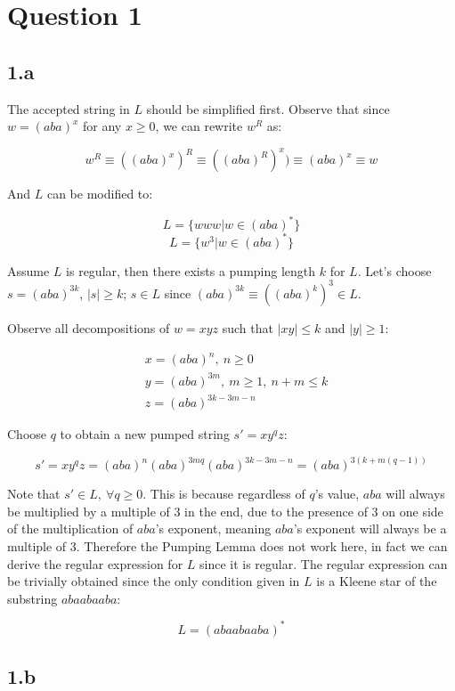 \documentclass{article}
\begin{document}
\section*{Question 1}

\subsection*{1.a}

The accepted string in $L$ should be simplified first. Observe that since $w=(aba)^x$ for any $x \geq 0$, we can rewrite $w^R$ as:

$$w^R \equiv ((aba)^x)^R \equiv ((aba)^R)^x) \equiv (aba)^x \equiv w$$

And $L$ can be modified to:

$$L = \{www | w \in (aba)^*\}$$
$$L = \{w^3 | w \in (aba)^*\}$$

Assume $L$ is regular, then there exists a pumping length $k$ for $L$. Let's choose $s = (aba)^{3k}$, $|s| \geq k$; $s \in L$ since $(aba)^{3k} \equiv ((aba)^{k})^3 \in L$.

Observe all decompositions of $w=xyz$ such that $|xy| \leq k$ and $|y| \geq 1$:

\begin{align*}
&x=(aba)^n, \: n \geq 0\\
&y=(aba)^{3m}, \: m\geq1, \: n+m \leq k\\
&z=(aba)^{3k-3m-n}
\end{align*}

Choose $q$ to obtain a new pumped string $s'=xy^qz$: 

$$s' = xy^qz = (aba)^n(aba)^{3mq}(aba)^{3k-3m-n} = (aba)^{3(k+m(q-1))}$$

Note that $s' \in L, \: \forall q\geq0$. This is because regardless of $q$'s value, $aba$ will always be multiplied by a multiple of 3 in the end, due to the presence of 3 on one side of the multiplication of $aba$'s exponent, meaning $aba$'s exponent will always be a multiple of 3. Therefore the Pumping Lemma does not work here, in fact we can derive the regular expression for $L$ since it is regular. The regular expression can be trivially obtained since the only condition given in $L$ is a Kleene star of the substring $abaabaaba$:

$$L = (abaabaaba)^*$$



\subsection*{1.b}
\end{document}
